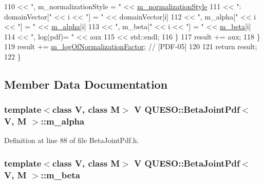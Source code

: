 \begin{DoxyCode}
110                               << \textcolor{stringliteral}{", m\_normalizationStyle = "}      << 
      \hyperlink{class_q_u_e_s_o_1_1_base_joint_pdf_a138c99bcef7a67077d9612bddfdcb896}{m\_normalizationStyle}
111                               << \textcolor{stringliteral}{": domainVector["} << i << \textcolor{stringliteral}{"] = "} << domainVector[i]
112                               << \textcolor{stringliteral}{", m\_alpha["} << i << \textcolor{stringliteral}{"] = "}      << \hyperlink{class_q_u_e_s_o_1_1_beta_joint_pdf_aaed2224330514a2b04d0b2924b7f9f49}{m\_alpha}[i]
113                               << \textcolor{stringliteral}{", m\_beta["} << i << \textcolor{stringliteral}{"] = "}       << \hyperlink{class_q_u_e_s_o_1_1_beta_joint_pdf_a71e4c9d34bc0732044efd7b30dea2841}{m\_beta}[i]
114                               << \textcolor{stringliteral}{", log(pdf)= "}                   << aux
115                               << std::endl;
116     \}
117     result += aux;
118   \}
119   result += \hyperlink{class_q_u_e_s_o_1_1_base_joint_pdf_ae82d4191f17af8c7a26226d127bc7850}{m\_logOfNormalizationFactor}; \textcolor{comment}{// [PDF-05]}
120 
121   \textcolor{keywordflow}{return} result;
122 \}
\end{DoxyCode}


\subsection{Member Data Documentation}
\hypertarget{class_q_u_e_s_o_1_1_beta_joint_pdf_aaed2224330514a2b04d0b2924b7f9f49}{
\subsubsection[{m\-\_\-alpha}]{\setlength{\rightskip}{0pt plus 5cm}template$<$class V, class M$>$ V {\bf Q\-U\-E\-S\-O\-::\-Beta\-Joint\-Pdf}$<$ V, M $>$\-::m\-\_\-alpha\hspace{0.3cm}{\ttfamily [protected]}}}\label{class_q_u_e_s_o_1_1_beta_joint_pdf_aaed2224330514a2b04d0b2924b7f9f49}


Definition at line 88 of file Beta\-Joint\-Pdf.\-h.

\hypertarget{class_q_u_e_s_o_1_1_beta_joint_pdf_a71e4c9d34bc0732044efd7b30dea2841}{
\subsubsection[{m\-\_\-beta}]{\setlength{\rightskip}{0pt plus 5cm}template$<$class V, class M$>$ V {\bf Q\-U\-E\-S\-O\-::\-Beta\-Joint\-Pdf}$<$ V, M $>$\-::m\-\_\-beta\hspace{0.3cm}{\ttfamily [protected]}}}\label{class_q_u_e_s_o_1_1_beta_joint_pdf_a71e4c9d34bc0732044efd7b30dea2841}


